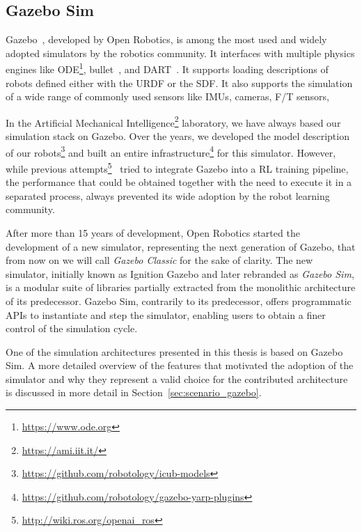 \begin{addmargin}{0cm}

\subsection{Gazebo Sim}

Gazebo~\parencite{koenig_design_2004}, developed by Open Robotics, is among the most used and widely adopted simulators by the robotics community.
It interfaces with multiple physics engines like ODE\footnote{\url{https://www.ode.org}}, bullet~\parencite{coumans_pybullet_2016}, and DART~\parencite{lee_dart_2018}.
It supports loading descriptions of robots defined either with the \ac{URDF} or the \ac{SDF}.
It also supports the simulation of a wide range of commonly used sensors like \acp{IMU}, cameras, \ac{F/T} sensors, \etc

In the Artificial Mechanical Intelligence\footnote{\url{https://ami.iit.it/}} laboratory, we have always based our simulation stack on Gazebo.
Over the years, we developed the model description of our robots\footnote{\url{https://github.com/robotology/icub-models}} and built an entire infrastructure\footnote{\url{https://github.com/robotology/gazebo-yarp-plugins}} for this simulator.
However, while previous attempts\footnote{\url{http://wiki.ros.org/openai_ros}}~\parencite{zamora_extending_2017,lopez_gym-gazebo2_2019} tried to integrate Gazebo into a \ac{RL} training pipeline, the performance that could be obtained together with the need to execute it in a separated process, always prevented its wide adoption by the robot learning community.

After more than 15 years of development, Open Robotics started the development of a new simulator, representing the next generation of Gazebo, that from now on we will call \emph{Gazebo Classic} for the sake of clarity.
The new simulator, initially known as Ignition Gazebo and later rebranded as \emph{Gazebo Sim}, is a modular suite of libraries partially extracted from the monolithic architecture of its predecessor.
Gazebo Sim, contrarily to its predecessor, offers programmatic \acp{API} to instantiate and step the simulator, enabling users to obtain a finer control of the simulation cycle.

One of the simulation architectures presented in this thesis is based on Gazebo Sim.
A more detailed overview of the features that motivated the adoption of the simulator and why they represent a valid choice for the contributed architecture is discussed in more detail in Section~\ref{sec:scenario_gazebo}.

\end{addmargin}

